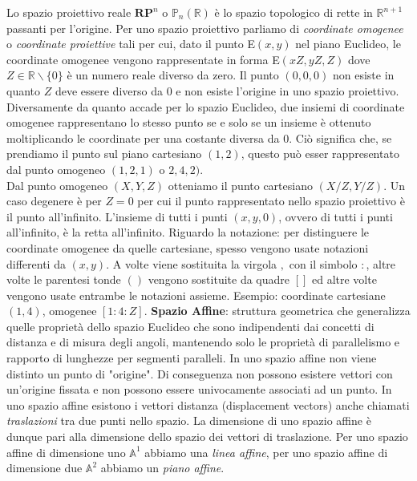 \documentclass[a4paper,12pt]{tesiinfo}
\begin{document}
\newline
Lo spazio proiettivo reale $\textbf{RP}^n$ o $\mathbb{P}_n(\mathbb{R})$ \`e lo spazio topologico di rette in $\mathbb{R}^ {n+1}$ passanti per l'origine.
\newline
Per uno spazio proiettivo parliamo di \textit{coordinate omogenee} o \textit{coordinate proiettive} tali per cui, dato il punto E$(x, y)$ nel piano Euclideo, le coordinate omogenee vengono rappresentate in forma E$(xZ, yZ, Z)$ dove $Z \in \mathbb{R} \backslash \{0\}$ \`e un numero reale diverso da zero. Il punto $(0, 0, 0)$ non esiste in quanto $Z$ deve essere diverso da $0$ e non esiste l'origine in uno spazio proiettivo. Diversamente da quanto accade per lo spazio Euclideo, due insiemi di coordinate omogenee rappresentano lo stesso punto se e solo se un insieme \`e ottenuto moltiplicando le coordinate per una costante diversa da 0. Ci\`o significa che, se prendiamo il punto sul piano cartesiano $(1, 2)$, questo pu\`o esser rappresentato dal punto omogeneo $(1, 2, 1)$ o $2, 4, 2)$.\\
Dal punto omogeneo $(X, Y, Z)$ otteniamo il punto cartesiano $(X/Z, Y/Z)$. Un caso degenere \`e per $Z=0$ per cui il punto rappresentato nello spazio proiettivo \`e il punto all'infinito. L'insieme di tutti i punti $(x, y, 0)$, ovvero di tutti i punti all'infinito, \`e la retta all'infinito.
\newline
Riguardo la notazione: per distinguere le coordinate omogenee da quelle cartesiane, spesso vengono usate notazioni differenti da $(x, y)$. A volte viene sostituita la virgola $,$ con il simbolo $:$, altre volte le parentesi tonde $()$ vengono sostituite da quadre $[]$ ed altre volte vengono usate entrambe le notazioni assieme. Esempio: coordinate cartesiane $(1, 4)$, omogenee $[1:4:Z]$.
\newline\newline
%
%
%
\textbf{Spazio Affine}: struttura geometrica che generalizza quelle propriet\`a dello spazio Euclideo che sono indipendenti dai concetti di distanza e di misura degli angoli, mantenendo solo le propriet\`a di parallelismo e rapporto di lunghezze per segmenti paralleli. In uno spazio affine non viene distinto un punto di "origine". Di conseguenza non possono esistere vettori con un'origine fissata e non possono essere univocamente associati ad un punto. In uno spazio affine esistono i vettori distanza (displacement vectors) anche chiamati \textit{traslazioni} tra due punti nello spazio. La dimensione di uno spazio affine \`e dunque pari alla dimensione dello spazio dei vettori di traslazione. Per uno spazio affine di dimensione uno $\mathbb{A}^1$ abbiamo una \textit{linea affine}, per uno spazio affine di dimensione due $\mathbb{A}^2$ abbiamo un \textit{piano affine}.
\end{document}
